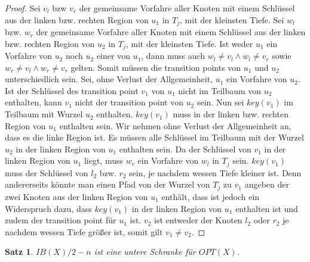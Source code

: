 \documentclass[a4paper,12pt]{article}
\begin{document}
\begin{proof}
 Sei $v_l$ bzw $v_r$ der gemeinsame Vorfahre aller Knoten mit einem Schlüssel aus der linken bzw. rechten Region von $u_1$ in $T_j$, mit der kleinsten Tiefe.  Sei $w_l$ bzw. $w_r$ der gemeinsame Vorfahre aller Knoten mit einem Schlüssel aus der linken bzw. rechten Region von $u_2$ in $T_j$, mit der kleinsten Tiefe. Ist weder $u_1$ ein Vorfahre von $u_2$ noch $u_2$ einer von $u_1$, dann muss auch $w_l \ne v_l \land w_l \ne v_r$ sowie $w_r \ne v_l \land w_r \ne v_r$ gelten. Somit müssen die transition points von $u_1$ und $u_2$ unterschiedlich sein. Sei, ohne Verlust der Allgemeinheit, $u_1$ ein Vorfahre von $u_2$. Ist der Schlüssel des transition point $v_1$ von $u_1$ nicht im Teilbaum von $u_2$ enthalten, kann $v_1$ nicht der transition point von $u_2$ sein. Nun sei $\mathit{key}\left(v_1\right)$ im Teilbaum mit Wurzel $u_2$ enthalten. $\mathit{key}\left(v_1\right)$ muss in der linken bzw. rechten Region von $u_1$ enthalten sein. Wir nehmen ohne Verlust der Allgemeinheit an, dass es die linke Region ist. Es müssen alle Schlüssel im Teilbaum mit der Wurzel $u_2$ in der linken Region von $u_1$ enthalten sein. Da der Schlüssel von $v_1$ in der linken Region von $u_1$ liegt, muss $w_r$ ein Vorfahre von $w_l$ in $T_j$ sein. $\mathit{key}\left(v_1\right)$ muss der Schlüssel von $l_2$ bzw. $r_2$ sein, je nachdem wessen Tiefe kleiner ist. Denn andererseits könnte man einen Pfad von der Wurzel von $T_j$ zu $v_1$ angeben der zwei Knoten aus der linken Region von $u_1$ enthält, dass ist jedoch ein Widerspruch dazu, dass  $\mathit{key}\left(v_1\right)$ in der linken Region von $u_1$ enthalten ist und zudem der transition point für $u_1$ ist. $v_2$ ist entweder der Knoten $l_2$ oder $r_2$ je nachdem wessen Tiefe größer ist, somit gilt $v_1 \ne v_2$.

\end{proof}
\newtheorem{Satz2}{Satz}[section] \label{satzDemaine1}
\begin{Satz2} 
$\mathit{IB}\left(X\right) /2 - n$ ist eine untere Schranke für $\mathit{OPT}\left(X\right)$.
\end{Satz2}
\end{document}
